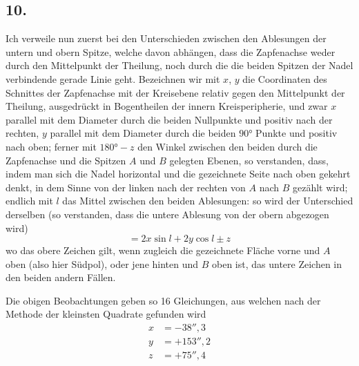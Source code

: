 \documentclass[12pt,a4paper]{article}
\begin{document}
\subsection*{10.}
Ich verweile nun zuerst bei den Unterschieden zwischen den Ablesungen der untern und obern Spitze, welche davon abhängen, dass die Zapfenachse weder durch den Mittelpunkt der Theilung, noch durch die die beiden Spitzen der Nadel verbindende gerade Linie geht. Bezeichnen wir mit $x$, $y$ die Coordinaten des Schnittes der Zapfenachse mit der Kreisebene relativ gegen den Mittelpunkt der Theilung, ausgedrückt in Bogentheilen der innern Kreisperipherie, und zwar $x$ parallel mit dem Diameter durch die beiden Nullpunkte und positiv nach der rechten, $y$ parallel mit dem Diameter durch die beiden $90°$ Punkte und positiv nach oben; ferner mit $180° - z$ den Winkel zwischen den beiden durch die Zapfenachse und die Spitzen $A$ und $B$ gelegten Ebenen, so verstanden, dass, indem man sich die Nadel horizontal und die gezeichnete Seite nach oben gekehrt denkt, in dem Sinne von der linken nach der rechten von $A$ nach $B$ gezählt wird; endlich mit $l$ das Mittel zwischen den beiden Ablesungen: so wird der Unterschied derselben (so verstanden, dass die untere Ablesung von der obern abgezogen wird)
\[ = 2x \sin l + 2y \cos l \pm z \]
wo das obere Zeichen gilt, wenn zugleich die gezeichnete Fläche vorne und $A$ oben (also hier Südpol), oder jene hinten und $B$ oben ist, das untere Zeichen in den beiden andern Fällen.

Die obigen Beobachtungen geben so 16 Gleichungen, aus welchen nach der Methode der kleinsten Quadrate gefunden wird
\begin{align*}
x &= -38''{,}3 \\
y &= +153''{,}2 \\
z &= +75''{,}4
\end{align*}
\end{document}
